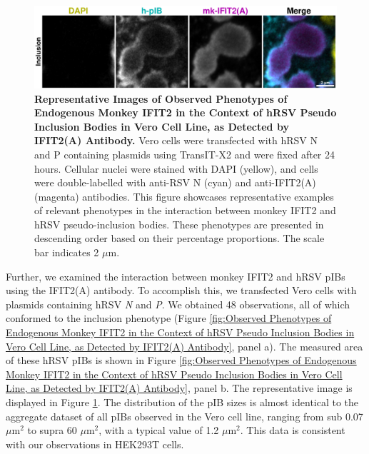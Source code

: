 \begin{figure}
    \centering
    \includegraphics[width=1\linewidth]{09. Chapter 4/Figs/01. pIB/03. IFIT2/02. IFIT2A/06. i2a-vero-hnhp.pdf}  
    \caption[Representative Images of Observed Phenotypes of Endogenous Monkey IFIT2 in the Context of hRSV Pseudo Inclusion Bodies in Vero Cell Line, as Detected by IFIT2(A) Antibody.]{\textbf{Representative Images of Observed Phenotypes of Endogenous Monkey IFIT2 in the Context of hRSV Pseudo Inclusion Bodies in Vero Cell Line, as Detected by IFIT2(A) Antibody.} Vero cells were transfected with hRSV N and P containing plasmids using TransIT-X2 and were fixed after 24 hours. Cellular nuclei were stained with DAPI (yellow), and cells were double-labelled with anti-RSV N (cyan) and anti-IFIT2(A) (magenta) antibodies. This figure showcases representative examples of relevant phenotypes in the interaction between monkey IFIT2 and hRSV pseudo-inclusion bodies. These phenotypes are presented in descending order based on their percentage proportions. The scale bar indicates 2 \(\mu \mbox{m}\).}
    \label{fig:Representative Images of Observed Phenotypes of Endogenous Monkey IFIT2 in the Context of hRSV Pseudo Inclusion Bodies in Vero Cell Line, as Detected by IFIT2(A) Antibody}
\end{figure}

Further, we examined the interaction between monkey IFIT2 and hRSV pIBs using the IFIT2(A) antibody. To accomplish this, we transfected Vero cells with plasmids containing hRSV \textit{N} and \textit{P}. We obtained 48 observations, all of which conformed to the inclusion phenotype (Figure \ref{fig:Observed Phenotypes of Endogenous Monkey IFIT2 in the Context of hRSV Pseudo Inclusion Bodies in Vero Cell Line, as Detected by IFIT2(A) Antibody}, panel a). The measured area of these hRSV pIBs is shown in Figure \ref{fig:Observed Phenotypes of Endogenous Monkey IFIT2 in the Context of hRSV Pseudo Inclusion Bodies in Vero Cell Line, as Detected by IFIT2(A) Antibody}, panel b. The representative image is displayed in Figure \ref{fig:Representative Images of Observed Phenotypes of Endogenous Monkey IFIT2 in the Context of hRSV Pseudo Inclusion Bodies in Vero Cell Line, as Detected by IFIT2(A) Antibody}. The distribution of the pIB sizes is almost identical to the aggregate dataset of all pIBs observed in the Vero cell line, ranging from sub 0.07 \(\mu \mbox{m}^2\) to supra 60 \(\mu \mbox{m}^2\), with a typical value of 1.2 \(\mu \mbox{m}^2\). This data is consistent with our observations in HEK293T cells.


